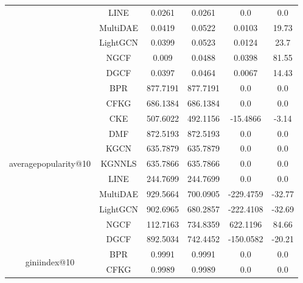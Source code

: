 \begin{table}[H]
{\begin{tabular}{|c|c|c|c|c|c|}
                                      & LINE & 0.0261 & 0.0261 & 0.0 & 0.0 \\ \cline{2-6}
                                      & MultiDAE & 0.0419 & 0.0522 & 0.0103 & 19.73 \\ \cline{2-6}
                                      & LightGCN & 0.0399 & 0.0523 & 0.0124 & 23.7 \\ \cline{2-6}
                                      & NGCF & 0.009 & 0.0488 & 0.0398 & 81.55 \\ \cline{2-6}
                                      & DGCF & 0.0397 & 0.0464 & 0.0067 & 14.43 \\ \cline{2-6}
            \hline
            \multirow{11}{*}{averagepopularity@10} & BPR & 877.7191 & 877.7191 & 0.0 & 0.0 \\ \cline{2-6}
                                                  & CFKG & 686.1384 & 686.1384 & 0.0 & 0.0 \\ \cline{2-6}
                                                  & CKE & 507.6022 & 492.1156 & -15.4866 & -3.14 \\ \cline{2-6}
                                                  & DMF & 872.5193 & 872.5193 & 0.0 & 0.0 \\ \cline{2-6}
                                                  & KGCN & 635.7879 & 635.7879 & 0.0 & 0.0 \\ \cline{2-6}
                                                  & KGNNLS & 635.7866 & 635.7866 & 0.0 & 0.0 \\\cline{2-6}
                                                  & LINE & 244.7699 & 244.7699 & 0.0 & 0.0 \\ \cline{2-6}
                                                  & MultiDAE & 929.5664 & 700.0905 & -229.4759 & -32.77 \\ \cline{2-6}
                                                  & LightGCN & 902.6965 & 680.2857 & -222.4108 & -32.69 \\ \cline{2-6}
                                                  & NGCF & 112.7163 & 734.8359 & 622.1196 & 84.66 \\ \cline{2-6}
                                                  & DGCF & 892.5034 & 742.4452 & -150.0582 & -20.21 \\ \cline{2-6}
            \hline
            \multirow{11}{*}{giniindex@10} & BPR & 0.9991 & 0.9991 & 0.0 & 0.0 \\ \cline{2-6}
                                            & CFKG & 0.9989 & 0.9989 & 0.0 & 0.0 \\ \cline{2-6}

\end{tabular}}
\end{table}
